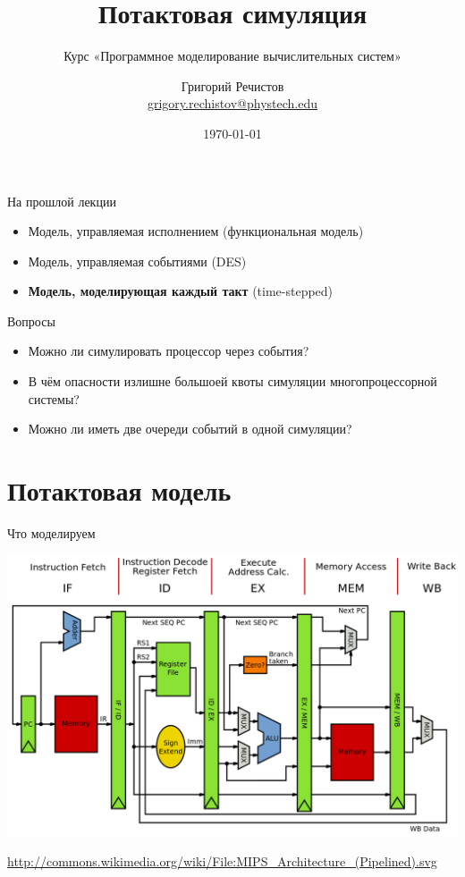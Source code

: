 \documentclass{beamer}
\title{Потактовая симуляция}
\subtitle{Курс «Программное моделирование вычислительных систем»}
\author[]{Григорий Речистов \\ \small{\href{mailto:grigory.rechistov@phystech.edu}{grigory.rechistov@phystech.edu}}}
\date{\today}
\begin{document}
\begin{frame}
    \maketitle
\end{frame}

\begin{frame}
    \tableofcontents
\end{frame}

\begin{frame}{На прошлой лекции}
\begin{itemize}
    \item Модель, управляемая исполнением (функциональная модель)
    \item Модель, управляемая событиями (DES)\pause
    \item \textbf{Модель, моделирующая каждый такт} (time-stepped)
\end{itemize}
\end{frame}

\begin{frame}{Вопросы}
\begin{itemize}
\item Можно ли симулировать процессор через события?\pause
\item В чём опасности излишне большоей квоты симуляции многопроцессорной системы?\pause
\item Можно ли иметь две очереди событий в одной симуляции?
\end{itemize}

\end{frame}

\section{Потактовая модель}

\begin{frame}{Что моделируем}
\centering

\includegraphics[width=\textwidth]{./mips-arch}

\tiny{\url{http://commons.wikimedia.org/wiki/File:MIPS_Architecture_(Pipelined).svg}}
\end{frame}
\end{document}
